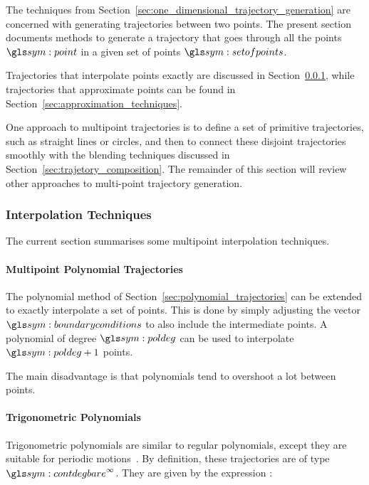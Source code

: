 		The techniques from
		Section~\ref{sec:one_dimensional_trajectory_generation} are concerned
		with generating trajectories between two points. The present section
		documents methods to generate a trajectory that goes through all the
		points $\point$ in a given set of points $\setofpoints$.

		Trajectories that interpolate points exactly are discussed in
		Section~\ref{sec:interpolation_techniques}, while trajectories that
		approximate points can be found in
		Section~\ref{sec:approximation_techniques}.

		One approach to multipoint trajectories is to define a set of primitive
		trajectories, such as straight lines or circles, and then to connect
		these disjoint trajectories smoothly with the blending techniques
		discussed in Section~\ref{sec:trajetory_composition}. The remainder of
		this section will review other approaches to multi-point trajectory
		generation.

		\subsubsection{Interpolation Techniques}%
		\label{sec:interpolation_techniques}

			The current section summarises some multipoint interpolation
			techniques.

			\paragraph{Multipoint Polynomial Trajectories}%
			\label{sec:multipoint_polynomial_trajectories}

				The polynomial method of
				Section~\ref{sec:polynomial_trajectories} can be extended to
				exactly interpolate a set of points. This is done by simply
				adjusting the vector $\boundaryconditions$ to also include the
				intermediate points. A polynomial of degree $\poldeg$ can be
				used to interpolate $\poldeg + 1$ points.

				The main disadvantage is that polynomials tend to overshoot a
				lot between points.

			\paragraph{Trigonometric Polynomials}%
			\label{sec:trigonometric_polynomials}

				Trigonometric polynomials are similar to regular polynomials,
				except they are suitable for periodic
				motions~\cite{bib:traj:trajectory_planning_for_automatic_machines_and_robots}.
				By definition, these trajectories are of type
				$\contdeg{\infty}$. They are given by the expression
				\cite{bib:traj:trajectory_planning_for_automatic_machines_and_robots}:

